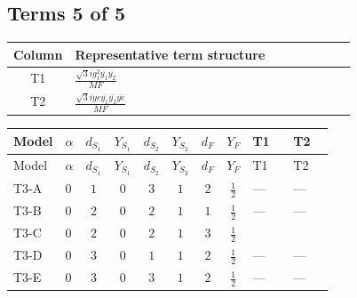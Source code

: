 \documentclass[8pt]{article}
\begin{document}
\begin{landscape}
\subsection*{Terms 5 of 5}
\begin{center}
\begin{tabular}{@{}c >{\raggedright\arraybackslash}p{0.82\linewidth}@{}}
\toprule
Column & Representative term structure \\
\midrule
T1 & \(\displaystyle \frac{\sqrt{3} i g_{1}^{2} \overline{y_{1}} \overline{y_{2}}}{MF}\) \\
\midrule
T2 & \(\displaystyle \frac{\sqrt{3} i ye \overline{y_{1}} \overline{y_{2}} \overline{ye}}{MF}\) \\
\midrule
\bottomrule
\end{tabular}
\end{center}
\smallskip
\tiny
\begin{longtable}{@{}llcccccc >{\raggedright\arraybackslash}p{0.21\linewidth} >{\raggedright\arraybackslash}p{0.21\linewidth}@{}}
\toprule
Model & $\alpha$ & $d_{S_1}$ & $Y_{S_1}$ & $d_{S_2}$ & $Y_{S_2}$ & $d_F$ & $Y_F$ & T1 & T2 \\
\midrule
\endfirsthead
\toprule
Model & $\alpha$ & $d_{S_1}$ & $Y_{S_1}$ & $d_{S_2}$ & $Y_{S_2}$ & $d_F$ & $Y_F$ & T1 & T2 \\
\midrule
\endhead
T3-A & $0$ & $1$ & $0$ & $3$ & $1$ & $2$ & $\frac{1}{2}$ & --- & --- \\
\midrule
T3-B & $0$ & $2$ & $0$ & $2$ & $1$ & $1$ & $\frac{1}{2}$ & --- & --- \\
\midrule
T3-C & $0$ & $2$ & $0$ & $2$ & $1$ & $3$ & $\frac{1}{2}$ & \scriptsize\adjustbox{max width=\linewidth}{$\begin{gathered} - \frac{\sqrt{3} i g_{1}^{2} \overline{y_{1}} \overline{y_{2}}}{16 MF}\end{gathered}$} & \scriptsize\adjustbox{max width=\linewidth}{$\begin{gathered} \frac{\sqrt{3} i ye \overline{y_{1}} \overline{y_{2}} \overline{ye}}{24 MF}\end{gathered}$} \\
\midrule
T3-D & $0$ & $3$ & $0$ & $1$ & $1$ & $2$ & $\frac{1}{2}$ & --- & --- \\
\midrule
T3-E & $0$ & $3$ & $0$ & $3$ & $1$ & $2$ & $\frac{1}{2}$ & --- & --- \\
\midrule
\bottomrule
\end{longtable}
\clearpage

\end{landscape}
\end{document}
